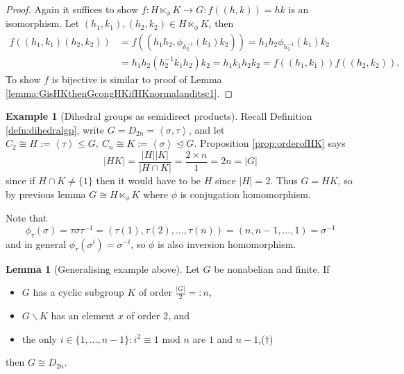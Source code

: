 \documentclass[a4paper]{article}
\newcommand{\la}{\left\langle}
\newcommand{\ra}{\right\rangle}
\newcommand{\Mod}{\text{ mod }}
\theoremstyle{definition}
\newtheorem{lemma}[defn]{Lemma}
\newtheorem{example}[defn]{Example}
\begin{document}
\begin{proof}
Again it suffices to show $f:H\ltimes_\phi K\rightarrow G:f((h,k))=hk$ is an isomorphism. Let $(h_1,k_1),(h_2,k_2)\in H\ltimes_\phi K$, then
\[
\begin{aligned}
f((h_1,k_1)(h_2,k_2))&=f((h_1h_2,\phi_{h_2^{-1}}(k_1)k_2))=h_1h_2\phi_{h_2^{-1}}(k_1)k_2\\
&=h_1h_2(h_2^{-1}k_1h_2)k_2=h_1k_1h_2k_2=f((h_1,k_1))f((h_2,k_2)).
\end{aligned}
\]
To show $f$ is bijective is similar to proof of Lemma \ref{lemma:GisHKthenGcongHKifHKnormalanditsc1}.
\end{proof}

\begin{example}[Dihedral groups as semidirect products]
Recall Definition \ref{defn:dihedralgp}, write $G=D_{2n}=\la\sigma,\tau\ra$, and let $C_2\cong H:=\la \tau\ra\leq G,\ C_n\cong K:=\la \sigma\ra\unlhd G$. Proposition \ref{prop:orderofHK} says
\[
|HK|=\frac{|H||K|}{|H\cap K|}=\frac{2\times n}{1}=2n=|G|
\]
since if $H\cap K\neq\{1\}$ then it would have to be $H$ since $|H|=2$. Thus $G=HK$, so by previous lemma $G\cong H\ltimes_\phi K$ where $\phi$ is conjugation homomorphism.

Note that
\[
\phi_\tau(\sigma)=\tau\sigma\tau^{-1}=(\tau(1),\tau(2),\ldots,\tau(n))=(n,n-1,\ldots,1)=\sigma^{-1}
\]
and in general $\phi_\tau(\sigma^i)=\sigma^{-i}$, so $\phi$ is also inversion homomorphism.
\end{example}

\begin{lemma}[Generalising example above]
\label{lemma:spottingD2n}
Let $G$ be nonabelian and finite. If \begin{itemize}
\item $G$ has a cyclic subgroup $K$ of order $\frac{|G|}{2}=:n$,
\item $G\backslash K$ has an element $x$ of order 2, and
\item the only $i\in\{1,\ldots,n-1\}:i^2\equiv 1\Mod n$ are $1$ and $n-1$,\hfill ($\dagger$)
\end{itemize}
then $G\cong D_{2n}$.
\end{lemma}
\end{document}

